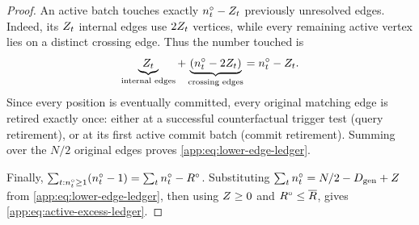 \begin{proof}
An active batch touches exactly
\(n_{t}^{\circ}-Z_{t}\) previously unresolved edges.
Indeed, its \(Z_{t}\) internal edges use
\(2Z_{t}\) vertices, while every remaining active vertex lies
on a distinct crossing edge. Thus the number touched is
\[
 \underbrace{Z_{t}}_{\text{internal edges}}
 +\underbrace{(n_{t}^{\circ}-2Z_{t})}_{\text{crossing edges}}
 =n_{t}^{\circ}-Z_{t}.
\]
Since every position is eventually committed, every original matching
edge is retired exactly once: either at a successful counterfactual
trigger test (query retirement), or at its first active commit batch
(commit retirement). Summing over the \(N/2\) original edges proves
\eqref{app:eq:lower-edge-ledger}.

Finally,
\(\sum_{t:n_{t}^{\circ}\ge1}(n_{t}^{\circ}-1)
=\sum_tn_{t}^{\circ}-R^{\circ}\).
Substituting
\(\sum_tn_{t}^{\circ}=N/2-D_{\mathrm{gen}}+Z\)
from \eqref{app:eq:lower-edge-ledger}, then using
\(Z\ge0\) and \(R^{\circ}\le\overline R{}\),
gives \eqref{app:eq:active-excess-ledger}.
\end{proof}
